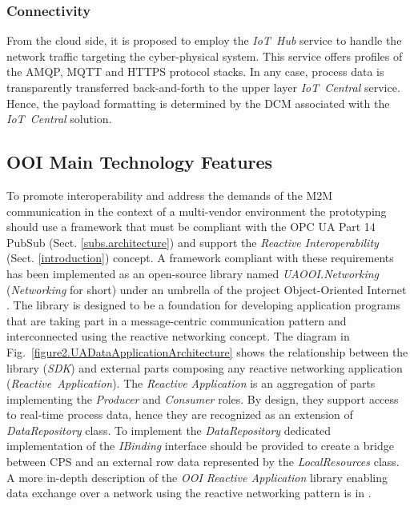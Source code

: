 \documentclass{jacsart}
\begin{document}
\subsubsection{Connectivity}\label{connectivity}

From the cloud side, it is proposed to employ the \textit{IoT\ Hub}
service to handle the network traffic targeting the cyber-physical
system. This service offers profiles of the AMQP, MQTT and HTTPS protocol
stacks. In any case, process data is transparently
transferred back-and-forth to the upper layer \textit{IoT\ Central}
service. Hence, the payload formatting is determined by the DCM
associated with the \textit{IoT\ Central} solution.

\subsection{OOI Main Technology Features}\label{ooi-main-technology-features}

To promote interoperability and address the demands of the M2M communication in the context of a multi-vendor environment the prototyping should use a framework that must be compliant with the OPC UA Part 14 PubSub (Sect. \ref*{subs.architecture}) and support the \emph{Reactive Interoperability} (Sect. \ref*{introduction}) concept. A framework compliant with these requirements has been implemented as an open-source library named \textit{UAOOI.Networking} (\textit{Networking} for short) under an umbrella of the project Object-Oriented Internet \cite{RefWorks:doc:5c66740ae4b081adf5804596}. The library is designed to be a foundation for developing application programs that are taking part in a message-centric communication pattern and interconnected using the reactive networking concept. The diagram in Fig.~\ref*{figure2.UADataApplicationArchitecture} shows the relationship between the library (\textit{SDK}) and external parts composing any reactive networking application (\textit{Reactive\ Application}). The \textit{Reactive Application} is an aggregation of parts implementing the \textit{Producer} and \textit{Consumer} roles. By design, they support access to real-time process data, hence they are recognized as an extension of \textit{DataRepository} class. To implement the \textit{DataRepository} dedicated implementation of the \textit{IBinding} interface should be provided to create a bridge between CPS and an external row data represented by the \textit{LocalResources} class. A more in-depth description of the \textit{OOI Reactive Application} library enabling data exchange over a network using the reactive networking pattern is in \cite{mpostol2020}.
\end{document}
